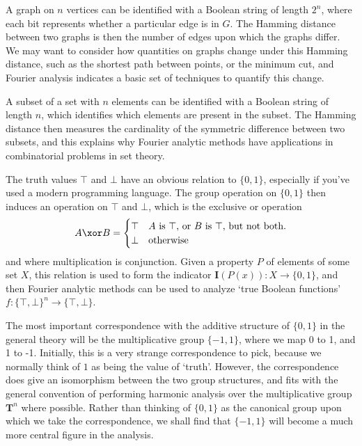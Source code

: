 \begin{example}
    A graph on $n$ vertices can be identified with a Boolean string of length $2^n$, where each bit represents whether a particular edge is in $G$. The Hamming distance between two graphs is then the number of edges upon which the graphs differ. We may want to consider how quantities on graphs change under this Hamming distance, such as the shortest path between points, or the minimum cut, and Fourier analysis indicates a basic set of techniques to quantify this change.
\end{example}

\begin{example}
    A subset of a set with $n$ elements can be identified with a Boolean string of length $n$, which identifies which elements are present in the subset. The Hamming distance then measures the cardinality of the symmetric difference between two subsets, and this explains why Fourier analytic methods have applications in combinatorial problems in set theory.
\end{example}

\begin{example}
    The truth values $\top$ and $\bot$ have an obvious relation to $\{ 0, 1 \}$, especially if you've used a modern programming language. The group operation on $\{ 0, 1 \}$ then induces an operation on $\top$ and $\bot$, which is the exclusive or operation
    \[ A \xor B = \begin{cases} \top & A\ \text{is}\ \top\text{, or}\ B\ \text{is}\ \top\text{, but not both.}\\ \bot & \text{otherwise} \end{cases} \]
    and where multiplication is conjunction. Given a property $P$ of elements of some set $X$, this relation is used to form the indicator $\mathbf{I}(P(x)): X \to \{ 0, 1 \}$, and then Fourier analytic methods can be used to analyze `true Boolean functions' $f: \{ \top, \bot \}^n \to \{ \top, \bot \}$.
\end{example}

The most important correspondence with the additive structure of $\{ 0, 1 \}$ in the general theory will be the multiplicative group $\{ -1, 1 \}$, where we map 0 to 1, and 1 to -1. Initially, this is a very strange correspondence to pick, because we normally think of $1$ as being the value of `truth'. However, the correspondence does give an isomorphism between the two group structures, and fits with the general convention of performing harmonic analysis over the multiplicative group $\mathbf{T}^n$ where possible. Rather than thinking of $\{ 0, 1 \}$ as the canonical group upon which we take the correspondence, we shall find that $\{ -1, 1 \}$ will become a much more central figure in the analysis.

